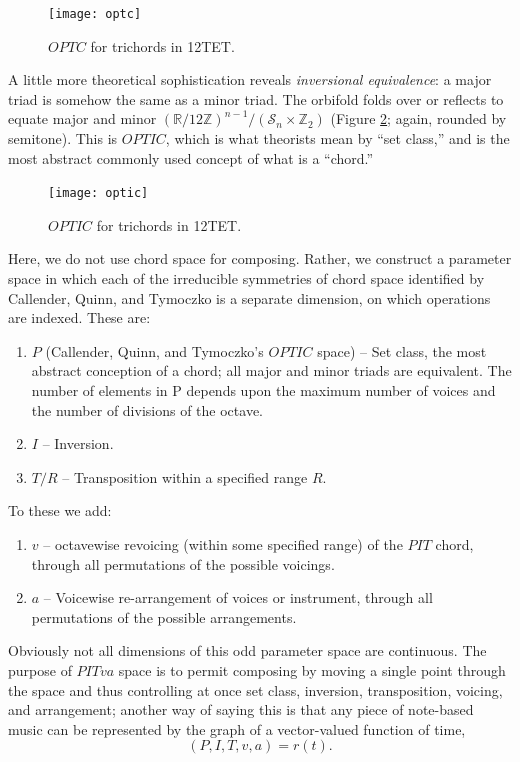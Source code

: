\documentclass[english,11pt,letterpaper,onecolumn]{scrartcl}
\numberwithin{equation}{section}
\begin{document}
    \begin{figure}
        \centerline{\texttt{[image: optc]}}
        \caption{\label{fig:optc} 
           $OPTC$ for trichords in 12TET.}
    \end{figure}

A little more theoretical sophistication reveals \textit{inversional 
equivalence}: a major triad is somehow the same as a minor triad. The 
orbifold folds over or reflects to equate major and minor 
$\left(\mathbb{R}/12\mathbb{Z}\right)^{n-1}/(\mathcal{S}_{n} \times 
\mathbb{Z}_{2})$ (Figure \ref{fig:optic}; again, rounded by semitone). This is 
$OPTIC$, which is what theorists mean by ``set class,'' and is the most 
abstract commonly used concept of what is a ``chord.''

    \begin{figure}
        \centerline{\texttt{[image: optic]}}
        \caption{\label{fig:optic} 
           $OPTIC$ for trichords in 12TET.}
    \end{figure}

Here, we do not use chord space for composing. Rather, we construct a parameter 
space in which each of the irreducible symmetries of chord space identified by 
Callender, Quinn, and Tymoczko is a separate dimension, on which operations are 
indexed. These are:

\begin{enumerate}
 \item $P$ (Callender, Quinn, and Tymoczko's $OPTIC$ space) -- Set class, the 
most abstract conception of a chord; all major and minor triads are equivalent. 
The number of elements in P depends upon the maximum number of voices and the 
number of divisions of the octave.
 \item $I$ -- Inversion.
 \item $T/R$ -- Transposition within a specified range $R$.
\end{enumerate}

\noindent To these we add:

\begin{enumerate}[resume]
 \item $v$ -- octavewise revoicing (within some specified range) of the 
$PIT$ chord, through all permutations of the possible voicings.
 \item $a$ -- Voicewise re-arrangement of voices or instrument, through all
permutations of the possible arrangements.
\end{enumerate}

\noindent Obviously not all dimensions of this odd parameter space are 
continuous. The purpose of $PITva$ space is to permit composing by moving a 
single point through the space and thus controlling at once set class, 
inversion, transposition, voicing, and arrangement; another way of saying this 
is that any piece of note-based music can be represented by the 
graph of a vector-valued function of time, $$(P, I, T, v, a) = 
r(t).$$
\end{document}

